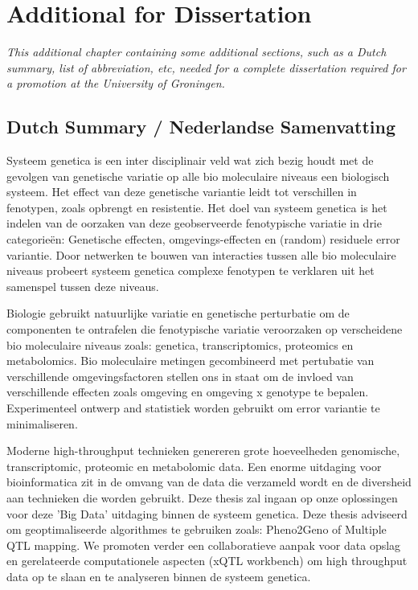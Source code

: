 \chapter{Additional for Dissertation}
\thispagestyle{empty}
\emph{This additional chapter containing some additional sections, such as a Dutch summary, 
list of abbreviation, etc, needed for a complete dissertation required for a promotion at 
the University of Groningen.}
\null
\vfill
\newpage

\section{Dutch Summary / Nederlandse Samenvatting}
Systeem genetica is een inter disciplinair veld wat zich bezig houdt met de gevolgen van 
genetische variatie op alle bio moleculaire niveaus een biologisch systeem. Het effect van 
deze genetische variantie leidt tot verschillen in fenotypen, zoals opbrengt en resistentie. 
Het doel van systeem genetica is het indelen van de oorzaken van deze geobserveerde 
fenotypische variatie in drie categorie\"en: Genetische effecten, omgevings-effecten en 
(random) residuele error variantie. Door netwerken te bouwen van interacties tussen 
alle bio moleculaire niveaus probeert systeem genetica complexe fenotypen te verklaren uit 
het samenspel tussen deze niveaus.

Biologie gebruikt natuurlijke variatie en genetische perturbatie om de componenten te ontrafelen
die fenotypische variatie veroorzaken op verscheidene bio moleculaire niveaus zoals: genetica, 
transcriptomics, proteomics en metabolomics. Bio moleculaire metingen gecombineerd met pertubatie 
van verschillende omgevingsfactoren stellen ons in staat om de invloed van verschillende 
effecten zoals omgeving en omgeving x genotype te bepalen. Experimenteel ontwerp and statistiek 
worden gebruikt om error variantie te minimaliseren.

Moderne high-throughput technieken genereren grote hoeveelheden genomische, transcriptomic, proteomic 
en metabolomic data. Een enorme uitdaging voor bioinformatica zit in de omvang van de data die verzameld 
wordt en de diversheid aan technieken die worden gebruikt. Deze thesis zal ingaan op onze oplossingen 
voor deze 'Big Data' uitdaging binnen de systeem genetica. Deze thesis adviseerd om geoptimaliseerde 
algorithmes te gebruiken zoals: Pheno2Geno of Multiple QTL mapping. We promoten verder een collaboratieve 
aanpak voor data opslag en gerelateerde computationele aspecten (xQTL workbench) om high throughput data 
op te slaan en te analyseren binnen de systeem genetica.

